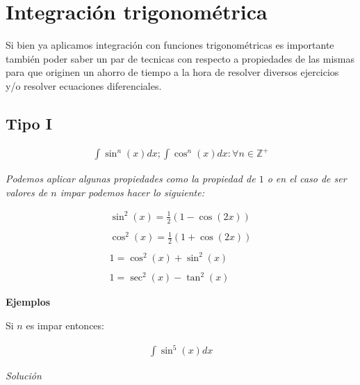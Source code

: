 \section{Integración trigonométrica}

Si bien ya aplicamos integración con funciones trigonométricas es importante también poder saber un par de tecnicas con respecto a propiedades de las mismas para que originen un ahorro de tiempo a la hora de resolver diversos ejercicios y/o resolver ecuaciones diferenciales.\\

\subsection{Tipo I}

\begin{equation*}
    \begin{gathered}
        \int\sin^{n}(x)dx;\int\cos^{n}(x)dx\colon\forall n\in\mathbb{Z^{+}}
    \end{gathered}
\end{equation*}

\textit{Podemos aplicar algunas propiedades como la propiedad de \(\displaystyle 1\) o en el caso de ser valores de \(\displaystyle n\) impar podemos hacer lo siguiente:}

\begin{equation*}
    \begin{gathered}
        \sin^{2}(x)=\frac{1}{2}\left(1-\cos(2x)\right)\\\\
        \cos^{2}(x)=\frac{1}{2}\left(1+\cos(2x)\right)\\\\
        1=\cos^{2}(x)+\sin^{2}(x)\\\\
        1=\sec^{2}(x)-\tan^{2}(x)
    \end{gathered}
\end{equation*}

\textbf{Ejemplos}

Si \(\displaystyle n\) es impar entonces:

\begin{equation}
    \begin{gathered}
        \int \sin^{5}(x)dx
    \end{gathered}
\end{equation}

\textit{Solución}\\


